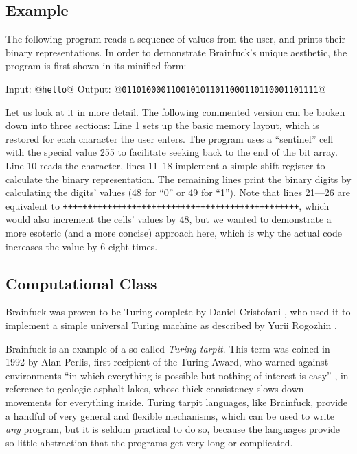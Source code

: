 \subsection{Example}

The following program reads a sequence of \ascii{} values from the user, and prints their binary representations. In order to demonstrate Brainfuck's unique aesthetic, the program is first shown in its minified form:



\begin{io}
Input: @\texttt{hello}@
Output: @\texttt{0110100001100101011011000110110001101111}@
\end{io}

Let us look at it in more detail. The following commented version can be broken down into three sections: Line 1 sets up the basic memory layout, which is restored for each character the user enters. The program uses a “sentinel” cell with the special value 255 to facilitate seeking back to the end of the bit array. Line 10 reads the character, lines 11--18 implement a simple shift register to calculate the binary representation. The remaining lines print the binary digits by calculating the digits' \ascii{} values (48 for “0” or 49 for “1”). Note that lines 21---26 are equivalent to \texttt{++++++++++++++++++++++++++++++++++++++++++++++++}, which would also increment the cells' values by 48, but we wanted to demonstrate a more esoteric (and a more concise) approach here, which is why the actual code increases the value by 6 eight times.




\subsection{Computational Class}

Brainfuck was proven to be Turing complete by Daniel Cristofani \cite{cristofani_universal}, who used it to implement a simple universal Turing machine as described by Yurii Rogozhin \cite{rogozhin1996small}.

Brainfuck is an example of a so-called \emph{Turing tarpit}. This term was coined in 1992 by Alan Perlis, first recipient of the Turing Award, who warned against environments “in which everything is possible but nothing of interest is easy” \cite{perlis1982epigrams}, in reference to geologic asphalt lakes, whose thick consistency slows down movements for everything inside. Turing tarpit languages, like Brainfuck, provide a handful of very general and flexible mechanisms, which can be used to write \emph{any} program, but it is seldom practical to do so, because the languages provide so little abstraction that the programs get very long or complicated.

